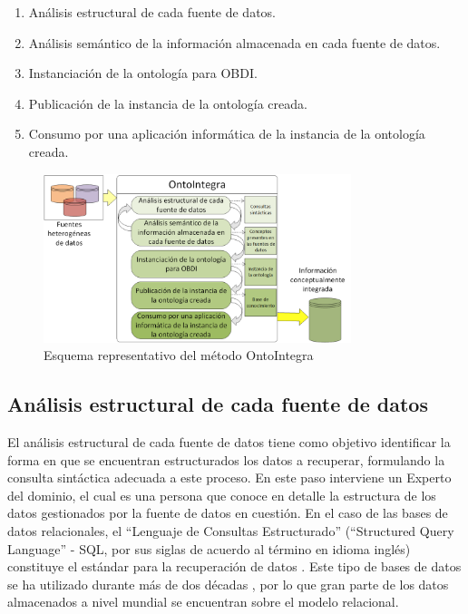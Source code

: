\begin{enumerate}
\item Análisis estructural de cada fuente de datos.
\item Análisis semántico de la información almacenada en cada fuente de datos.
\item Instanciación de la ontología para OBDI.
\item Publicación de la instancia de la ontología creada.
\item Consumo por una aplicación informática de la instancia de la ontología creada.
\end{enumerate}

\begin{figure}
\begin{center}
	\includegraphics[width=0.8\textwidth]{img/Metodo_OntoIntegra.png}
\end{center}
\caption{Esquema representativo del método OntoIntegra}
\label{fig: metodoOntoIntegra}
\end{figure}

\subsection{Análisis estructural de cada fuente de datos}

El análisis estructural de cada fuente de datos tiene como objetivo identificar la forma en que se encuentran estructurados los datos a recuperar, formulando la consulta sintáctica adecuada a este proceso. En este paso interviene un Experto del dominio, el cual es una persona que conoce en detalle la estructura de los datos gestionados por la fuente de datos en cuestión. En el caso de las bases de datos relacionales, el ``Lenguaje de Consultas Estructurado'' (``Structured Query Language'' - SQL, por sus siglas de acuerdo al término en idioma inglés) constituye el estándar para la recuperación de datos \citep{Eisenberg:1999:SFK:309844.310075}. Este tipo de bases de datos se ha utilizado durante más de dos décadas \citep{BUCKLES1993660,Hristidis2002670,10.1007/978-981-10-8276-4_22}, por lo que gran parte de los datos almacenados a nivel mundial se encuentran sobre el modelo relacional.

